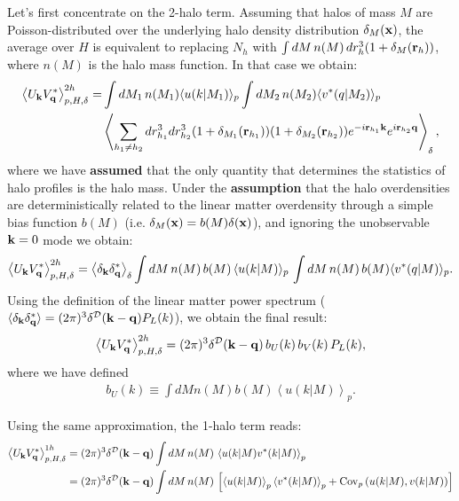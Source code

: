 \documentclass{article}
\begin{document}
  Let's first concentrate on the 2-halo term. Assuming that halos of mass $M$ are Poisson-distributed over the underlying halo density distribution $\delta_M({\bf x})$, the average over $H$ is equivalent to replacing $N_h$ with $\int dM\,n(M)\,dr^3_h(1+\delta_M({\bf r}_h))$, where $n(M)$ is the halo mass function. In that case we obtain:
  \begin{align}
    \left\langle U_{\bf k}V^*_{\bf q}\right\rangle_{p,H,\delta}^{2h}=&\int dM_1\,n(M_1) \langle u(k|M_1)\rangle_p\int dM_2\,n(M_2) \langle v^*(q|M_2)\rangle_p\\&\left\langle\sum_{h_1\neq h_2}dr_{h_1}^3dr_{h_2}^3(1+\delta_{M_1}({\bf r}_{h_1}))(1+\delta_{M_2}({\bf r}_{h_2}))e^{-i{\bf r}_{h_1}{\bf k}}e^{i{\bf r}_{h_2}{\bf q}}\right\rangle_{\delta},
  \end{align}
  where  we have {\bf assumed} that the only quantity that determines the statistics of halo profiles is the halo mass. Under the {\bf assumption} that the halo overdensities are deterministically related to the linear matter overdensity through a simple bias function $b(M)$ (i.e. $\delta_M({\bf x})=b(M)\delta({\bf x})$), and ignoring the unobservable ${\bf k}=0$ mode we obtain:
  \begin{align}
    \left\langle U_{\bf k}V^*_{\bf q}\right\rangle_{p,H,\delta}^{2h}=\left\langle\delta_{\bf k}\delta^*_{\bf q}\right\rangle_\delta\int dM\,n(M)\,b(M)\,\langle u(k|M)\rangle_p\,\int dM\,n(M)\,b(M) \langle v^*(q|M)\rangle_p.
  \end{align}
  Using the definition of the linear matter power spectrum ($\langle\delta_{\bf k}\delta_{\bf q}^*\rangle=(2\pi)^3\delta^{\cal D}({\bf k}-{\bf q})P_L(k)$), we obtain the final result:
  \begin{align}
    \left\langle U_{\bf k}V^*_{\bf q}\right\rangle_{p,H,\delta}^{2h}=(2\pi)^3\delta^{\cal D}({\bf k}-{\bf q})\,b_U(k)\,b_V(k)\,P_L(k),
  \end{align}
  where we have defined
  \begin{align}
    b_U(k)\equiv\int dM n(M) b(M) \left\langle u(k|M)\right\rangle_p.
  \end{align}

  Using the same approximation, the 1-halo term reads:
  \begin{align}
    \left\langle U_{\bf k}V^*_{\bf q}\right\rangle_{p,H,\delta}^{1h}&=(2\pi)^3\delta^{\cal D}({\bf k}-{\bf q})\int dM\,n(M)\,\left\langle u(k|M) v^*(k|M)\right\rangle_p\\
    &=(2\pi)^3\delta^{\cal D}({\bf k}-{\bf q})\int dM\,n(M)\,\left[\left\langle u(k|M)\right\rangle_p\left\langle v^*(k|M)\right\rangle_p+{\rm Cov}_p\left(u(k|M),v(k|M)\right)\right]
  \end{align}
\end{document}
